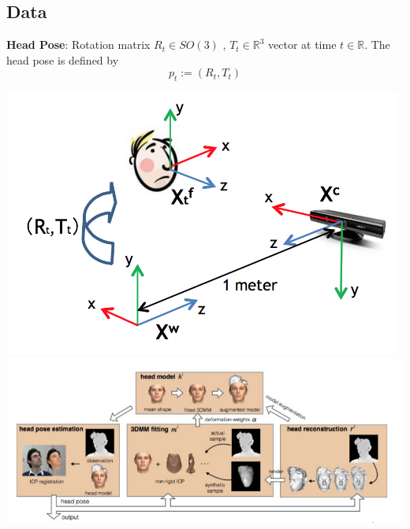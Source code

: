 \documentclass{beamer}
\begin{document}
\subsection{Data}

\begin{frame}
\textbf{Head Pose}: \newline
Rotation matrix $R_t \in SO(3)$ , $T_t \in \mathbb{R}^3$ vector at time $t\in \mathbb{R}$. The head pose is defined by
\begin{equation}
p_t := (R_t, T_t)
\end{equation}
\begin{center}
\includegraphics[scale=0.18]{Pictures/HeadPoseWCS.png}
\includegraphics[scale=0.27]{Pictures/HeadPose.png}
\end{center}
\end{frame}
\end{document}
